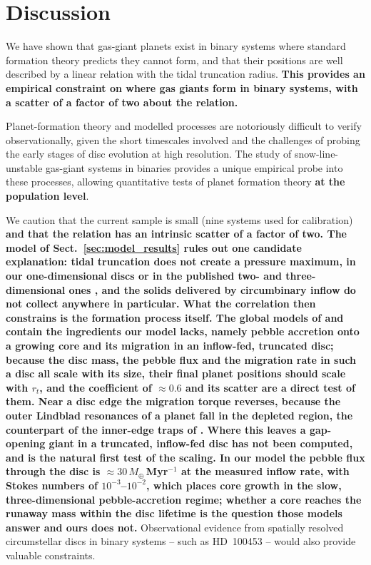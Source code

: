 \documentclass{aa}
\newcommand{\rev}[1]{{\color{red}\textbf{#1}}}
\begin{document}
\section{Discussion}
\label{sec:discussion}

We have shown that gas-giant planets exist in binary systems where
standard formation theory predicts they cannot form, and that their
positions are well described by a linear relation with the tidal
truncation radius. \rev{This provides an empirical constraint on where
gas giants form in binary systems, with a scatter of a factor of two
about the relation.}

Planet-formation theory and modelled processes are notoriously difficult
to verify observationally, given the short timescales involved and the
challenges of probing the early stages of disc evolution at high
resolution. The study of snow-line-unstable gas-giant systems in
binaries provides a unique empirical probe into these processes, allowing
quantitative tests of planet formation theory \rev{at the population
level}.

We caution that the current sample is small (nine systems used for
calibration) \rev{and that the relation has an intrinsic scatter of a
factor of two. The model of Sect.~\ref{sec:model_results} rules out one
candidate explanation: tidal truncation does not create a pressure
maximum, in our one-dimensional discs or in the published two- and
three-dimensional ones \citep{Muller2012, Jordan2021, Marzari2025,
Marzari2025b}, and the solids delivered by circumbinary inflow do not
collect anywhere in particular. What the correlation then constrains is
the formation process itself. The global models of \citet{Venturini2026}
and \citet{Ronco2026} contain the ingredients our model lacks, namely
pebble accretion onto a growing core and its migration in an
inflow-fed, truncated disc; because the disc mass, the pebble flux and
the migration rate in such a disc all scale with its size, their final
planet positions should scale with $r_t$, and the coefficient of
$\approx0.6$ and its scatter are a direct test of them. Near a disc
edge the migration torque reverses, because the outer Lindblad
resonances of a planet fall in the depleted region, the counterpart of
the inner-edge traps of \citet{Masset2006}. Where this leaves a
gap-opening giant in a truncated, inflow-fed disc has not been
computed, and is the natural first test of the scaling. In our model
the pebble flux through the disc is $\approx30\,M_\oplus$\,Myr$^{-1}$ at
the measured inflow rate, with Stokes numbers of $10^{-3}$--$10^{-2}$,
which places core growth in the slow, three-dimensional pebble-accretion
regime; whether a core reaches the runaway mass within the disc lifetime
is the question those models answer and ours does not.}
Observational evidence from spatially resolved circumstellar discs in
binary systems -- such as HD~100453 \citep[cf.][]{Cuello2025} -- would
also provide valuable constraints.
\end{document}

